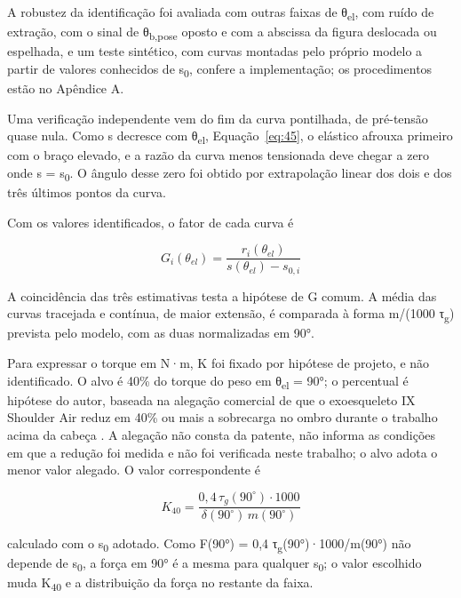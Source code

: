 A robustez da identificação foi avaliada com outras faixas de θ\textsubscript{el}, com ruído de extração, com o sinal de θ\textsubscript{b,pose} oposto e com a abscissa da figura deslocada ou espelhada, e um teste sintético, com curvas montadas pelo próprio modelo a partir de valores conhecidos de s\textsubscript{0}, confere a implementação; os procedimentos estão no Apêndice A.

Uma verificação independente vem do fim da curva pontilhada, de pré-tensão quase nula. Como s decresce com θ\textsubscript{el}, Equação~\eqref{eq:45}, o elástico afrouxa primeiro com o braço elevado, e a razão da curva menos tensionada deve chegar a zero onde s = s\textsubscript{0}. O ângulo desse zero foi obtido por extrapolação linear dos dois e dos três últimos pontos da curva.

Com os valores identificados, o fator de cada curva é

\begin{equation}
  G_{i}(\theta_{el}) = \frac{r_{i}(\theta_{el})}{s(\theta_{el}) - s_{0,i}}
  \label{eq:53}
\end{equation}

A coincidência das três estimativas testa a hipótese de G comum. A média das curvas tracejada e contínua, de maior extensão, é comparada à forma m/(1000 τ\textsubscript{g}) prevista pelo modelo, com as duas normalizadas em 90°.

Para expressar o torque em N·m, K foi fixado por hipótese de projeto, e não identificado. O alvo é 40\% do torque do peso em θ\textsubscript{el} = 90°; o percentual é hipótese do autor, baseada na alegação comercial de que o exoesqueleto IX Shoulder Air reduz em 40\% ou mais a sobrecarga no ombro durante o trabalho acima da cabeça \cite{suitx}. A alegação não consta da patente, não informa as condições em que a redução foi medida e não foi verificada neste trabalho; o alvo adota o menor valor alegado. O valor correspondente é

\begin{equation}
  K_{40} = \frac{0{,}4\,\tau_{g}(90^{\circ}) \cdot 1000}{\delta(90^{\circ})\, m(90^{\circ})}
  \label{eq:54}
\end{equation}

calculado com o s\textsubscript{0} adotado. Como F(90°) = 0,4 τ\textsubscript{g}(90°)·1000/m(90°) não depende de s\textsubscript{0}, a força em 90° é a mesma para qualquer s\textsubscript{0}; o valor escolhido muda K\textsubscript{40} e a distribuição da força no restante da faixa.


